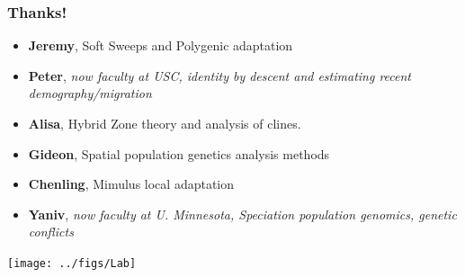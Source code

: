 \documentclass{beamer}
\begin{document}
\begin{frame}
	\frametitle{Thanks!}

			\begin{itemize}
				\item {\bf Jeremy}, Soft Sweeps and
                                  Polygenic adaptation
				\item {\bf Peter}, \it{now faculty at USC}, identity by descent and
                                  estimating recent demography/migration
				\item {\bf Alisa}, Hybrid Zone theory and
                                  analysis of clines.        
				\item {\bf Gideon}, Spatial population
                                  genetics analysis methods
				\item {\bf Chenling}, Mimulus local adaptation
                                 \item {\bf Yaniv}, \it{now faculty at U. Minnesota}, Speciation population
                                   genomics, genetic conflicts
			\end{itemize}

      \begin{center} \texttt{[image: ../figs/Lab]} \end{center}


\end{frame}
\end{document}
